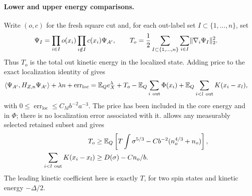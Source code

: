 \paragraph{Lower and upper energy comparisons.}
Write $(o,c)$ for the fresh square cut and, for each out-label set
$I\subset\{1,\ldots,n\}$, set
\[
 \Psi_I=\prod_{i\in I}o(x_i)\prod_{i\notin I}c(x_i)\Psi_{A'},
 \qquad
 T_o=\frac12\sum_{I\subset\{1,\ldots,n\}}\sum_{i\in I}
                    \lVert\nabla_i\Psi_I\rVert_2^2.
\]
Thus $T_o$ is the total out kinetic energy in the localized state.
Adding price to the exact localization identity of
\cite[\FLocalization]{Foundation} gives
\begin{equation}
 \langle\Psi_{A'},H_{Z,n}\Psi_{A'}\rangle+\lambda n
       +\operatorname{err}_{\mathrm{loc}}
 =\mathbb E_Qe_X^\lambda+T_o
       -\mathbb E_Q\sum_{i\ \mathrm{out}}\Phi(x_i)
       +\mathbb E_Q\sum_{i<l\ \mathrm{out}}K(x_i-x_l),
 \label{eq:priced-localization-identity}
\end{equation}
with $0\leq\operatorname{err}_{\mathrm{loc}}\leq C_Mb^{-2}a^{-3}$.
The price has been included in the core energy and in $\Phi$; there is
no localization error associated with it.  \cite[\FNeumann]{Foundation}
allows any measurably selected retained subset and gives
\begin{equation}
 \begin{split}
 T_o&\geq\mathbb E_Q\left[T\int\sigma^{5/3}
                              -Cb^{-2}(n_o^{4/3}+n_o)\right],\\
 \sum_{i<l\ \mathrm{out}}K(x_i-x_l)&\geq D(\sigma)-Cn_o/b.
 \end{split}
 \label{eq:patch-lower-comparison}
\end{equation}
The leading kinetic coefficient here is exactly $T$, for two spin states
and kinetic energy $-\Delta/2$.

